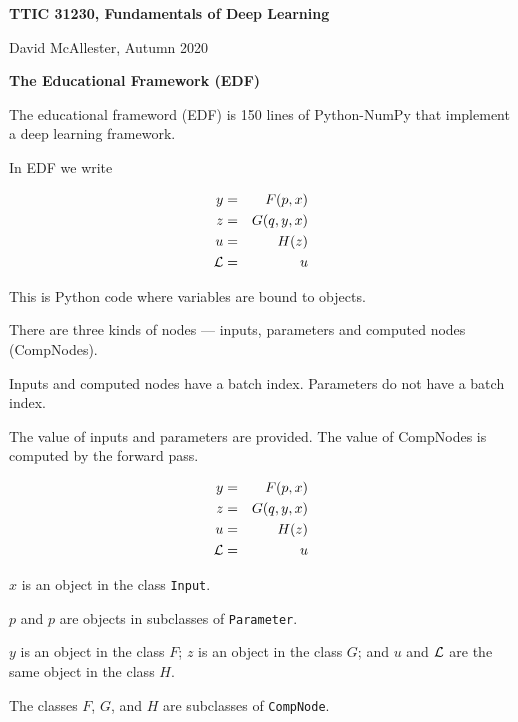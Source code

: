 




{\Huge
  
  \centerline{\bf TTIC 31230, Fundamentals of Deep Learning}
  \bigskip
  \centerline{David McAllester, Autumn 2020}
  \vfill
  \vfill
  \centerline{\bf The Educational Framework (EDF)}
  \vfill
  \vfill


The educational frameword (EDF) is 150 lines of Python-NumPy that implement a deep learning framework.

\vfill
In EDF we write

\vfill
\begin{eqnarray*}
  y & = & F(p,x) \\
  z & = & G(q,y,x) \\
  u & = & H(z) \\
  {\cal L} &  = &  u
\end{eqnarray*}
\medskip

\vfill
This is Python code where variables are bound to objects.


There are three kinds of nodes --- inputs, parameters and computed nodes (CompNodes).

\vfill
Inputs and computed nodes have a batch index.  Parameters do not have a batch index.

\vfill

The value of inputs and parameters are provided. The value of CompNodes is computed by the forward pass.


\begin{eqnarray*}
  y & = & F(p,x) \\
  z & = & G(q,y,x) \\
  u & = & H(z) \\
  {\cal L} &  = &  u
\end{eqnarray*}

\vfill
$x$ is an object in the class {\tt Input}.

\vfill
$p$ and $p$ are objects in subclasses of {\tt Parameter}.

\vfill
$y$ is an object in the class $F$;
$z$ is an object in the class $G$;
and $u$ and ${\cal L}$ are the same object in the class $H$.

\vfill
The classes $F$, $G$, and $H$ are subclasses of {\tt CompNode}.

}
